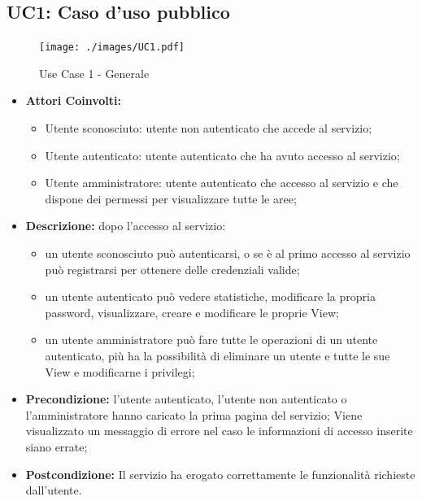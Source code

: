 \subsection{UC1: Caso d'uso pubblico}

\begin{figure}[htbp]
    \centering
    \centerline{\texttt{[image: ./images/UC1.pdf]}}
    \caption{Use Case 1 - Generale}
\end{figure}

\begin{itemize}

    \item \textbf{Attori Coinvolti:}
    \begin{itemize}

    	\item Utente sconosciuto: utente non autenticato che accede al servizio;
    	\item Utente autenticato: utente autenticato che ha avuto accesso al servizio;
    	\item Utente amministratore: utente autenticato che accesso al servizio e che dispone dei permessi per visualizzare tutte le aree;
	\end{itemize}
    \item \textbf{Descrizione:}
    dopo l'accesso al servizio:
    \begin{itemize}
    	\item un utente sconosciuto può autenticarsi, o se è al primo accesso al servizio può registrarsi per ottenere delle credenziali valide;
    	\item un utente autenticato può vedere statistiche, modificare la propria password, visualizzare, creare e modificare le proprie View;
  		\item un utente amministratore può fare tutte le operazioni di un utente autenticato, più ha la possibilità di eliminare un utente e tutte le sue View e modificarne i privilegi;
	\end{itemize}
    \item \textbf{Precondizione:} l'utente autenticato, l'utente non autenticato o l'amministratore hanno caricato la prima pagina del servizio;
    Viene visualizzato un messaggio di errore nel caso le informazioni di accesso inserite siano errate;
    \item \textbf{Postcondizione:}
    Il servizio ha erogato correttamente le funzionalità richieste dall'utente.

\end{itemize}

